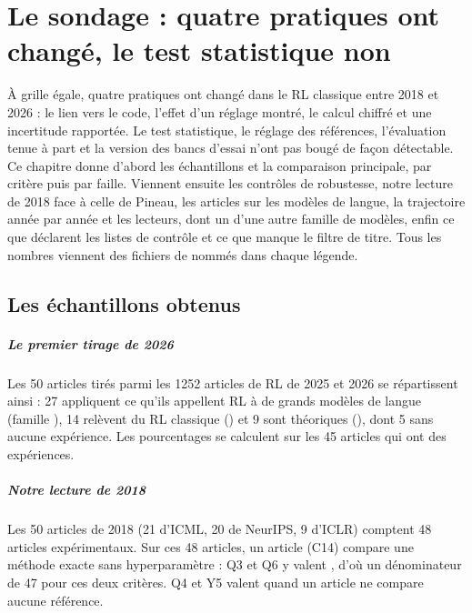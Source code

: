 \chapter{Le sondage : quatre pratiques ont changé, le test statistique non}\label{chap:04-sondage-resultats}

À grille égale, quatre pratiques ont changé dans le RL classique entre 2018 et 2026 : le lien vers le
code, l'effet d'un réglage montré, le calcul chiffré et une incertitude rapportée. Le test
statistique, le réglage des références, l'évaluation tenue à part et la version des bancs d'essai
n'ont pas bougé de façon détectable. Ce chapitre donne d'abord les échantillons et la comparaison
principale, par critère puis par faille. Viennent ensuite les contrôles de robustesse, notre lecture
de 2018 face à celle de Pineau, les articles sur les modèles de langue, la trajectoire année par
année et les lecteurs, dont un d'une autre famille de modèles, enfin ce que déclarent les listes
de contrôle et ce que manque le filtre de titre. Tous les nombres viennent des fichiers de
 nommés dans chaque légende.

\section{Les échantillons obtenus}\label{sec:sr-echantillons}

\paragraph{Le premier tirage de 2026}
Les 50 articles tirés parmi les \num{1252} articles de RL de 2025 et 2026 se répartissent ainsi : 27
appliquent ce qu'ils appellent RL à de grands modèles de langue (famille ), 14 relèvent du RL
classique () et 9 sont théoriques (), dont 5 sans aucune expérience. Les
pourcentages se calculent sur les 45 articles qui ont des expériences.

\paragraph{Notre lecture de 2018}
Les 50 articles de 2018 (21 d'ICML, 20 de NeurIPS, 9 d'ICLR) comptent 48 articles expérimentaux. Sur
ces 48 articles, un article (C14) compare une méthode exacte sans hyperparamètre : Q3 et Q6 y valent
, d'où un dénominateur de 47 pour ces deux critères. Q4 et Y5 valent  quand un
article ne compare aucune référence.


